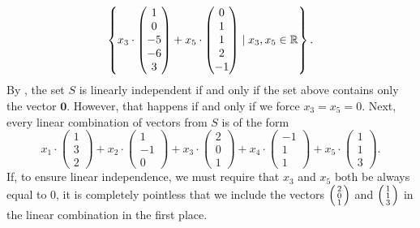 \begin{equation}
 \label{eq:li-if-0}
 \left\{ x_3 \cdot 
  \begin{pmatrix}
   1\\
   0\\
   -5\\
   -6\\
   3
  \end{pmatrix}
  + x_5 \cdot
  \begin{pmatrix}
   0\\
   1\\
   1\\
   2\\
   -1
  \end{pmatrix}
  \mid x_3,x_5 \in \mathbb{R}
 \right\}.
\end{equation}
By , the set $S$ is linearly independent if
and only if the set above contains only the vector $\mathbf{0}$. However, that
happens if and only if we force $x_3 = x_5 = 0$. Next, every linear combination
of vectors from $S$ is of the form
\[
 x_1 \cdot 
 \begin{pmatrix}
  1\\
  3\\
  2
 \end{pmatrix}
 + x_2 \cdot 
 \begin{pmatrix}
  1\\
  -1\\
  0
 \end{pmatrix}
 + x_3 \cdot 
 \begin{pmatrix}
  2\\
  0\\
  1
 \end{pmatrix}
 + x_4 \cdot 
 \begin{pmatrix}
  -1\\
  1\\
  1
 \end{pmatrix}
 + x_5 \cdot 
 \begin{pmatrix}
  1\\
  1\\
  3
 \end{pmatrix}.
\]
If, to ensure linear independence, we must require that $x_3$ and $x_5$ both be
always equal to $0$, it is completely pointless that we include the vectors
$\begin{psmallmatrix} 2 \\ 0 \\ 1 \end{psmallmatrix}$ and $\begin{psmallmatrix}
1 \\ 1 \\ 3 \end{psmallmatrix}$ in the linear combination in the first place.

